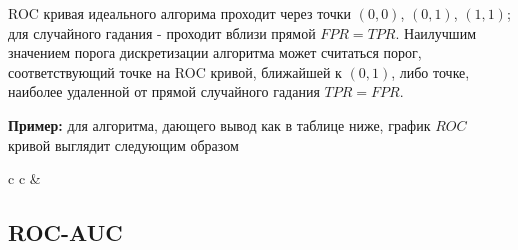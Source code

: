 ROC кривая идеального алгорима проходит через точки $(0,0)$, $(0,1)$, $(1,1)$; для случайного гадания - проходит вблизи прямой $FPR = TPR$. Наилучшим значением порога дискретизации алгоритма может считаться порог, соответствующий точке на ROC кривой, ближайшей к $(0, 1)$, либо точке, наиболее удаленной от прямой случайного гадания $TPR = FPR$. 

\textbf{Пример:} для алгоритма, дающего вывод как в таблице ниже, график $ROC$ кривой выглядит следующим образом

\begin{tabular}{ c c }
    & 
\end{tabular}

\subsection{ROC-AUC}

